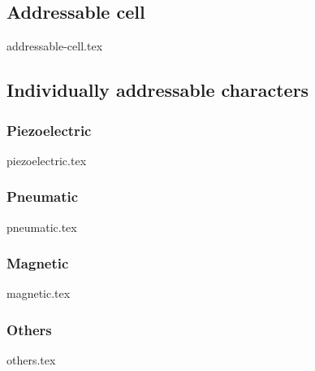     \subsection{Addressable cell}
        {addressable-cell.tex}
    \subsection{Individually addressable characters}
        \subsubsection{Piezoelectric}
        {piezoelectric.tex}
        
        \subsubsection{Pneumatic}
        {pneumatic.tex}

        \subsubsection{Magnetic}
        {magnetic.tex}

        \subsubsection{Others}
        {others.tex}